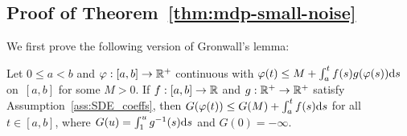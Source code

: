 \subsection{Proof of Theorem~\ref{thm:mdp-small-noise}}\label{sec:thm:mdp-small-noise_Proof}
We first prove the following version of Gronwall's lemma:
\begin{lemma}\label{lem:Gronwall-bis}
Let $0\leq a < b$ and $\varphi:[a,b]\rightarrow \mathbb{R}^+$ continuous with
${\varphi(t)\leq M + \int_a^t f(s) g(\varphi(s))\mathrm{d} s}$ on~$[a,b]$ for some $M>0$.
If $f:[a,b]\rightarrow \mathbb{R}$ and $g:\mathbb{R}^+\rightarrow\mathbb{R}^+$ satisfy Assumption~\ref{ass:SDE_coeffs}, then
$G(\varphi(t)) \leq G(M) + \int_a^t f(s)\mathrm{d} s$ for all $t \in [a,b]$,
where $G(u) = \int_1^u g^{-1}(s)\mathrm{d} s$ and $G(0) = -\infty$.
\end{lemma}

